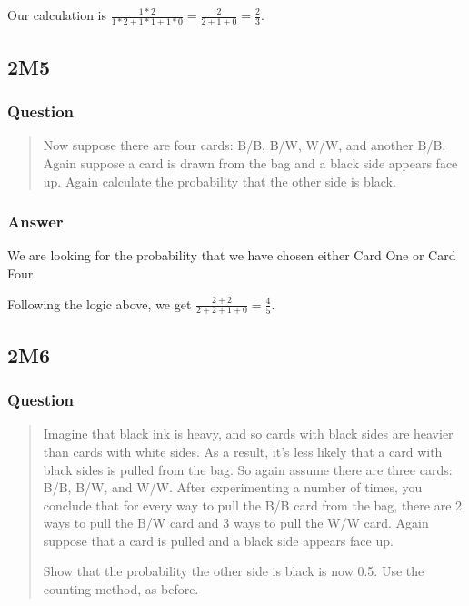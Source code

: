 \documentclass[
]{book}
\begin{document}
Our calculation is \(\frac{1 * 2}{1 * 2 + 1 * 1 + 1 * 0} = \frac{2}{2+1+0} = \frac{2}{3}\).

\hypertarget{m5}{%
\subsection*{2M5}\label{m5}}

\hypertarget{question-8}{%
\subsubsection*{Question}\label{question-8}}

\begin{quote}
Now suppose there are four cards: B/B, B/W, W/W, and another B/B. Again suppose a card is drawn from the bag and a black side appears face up. Again calculate the probability that the other side is black.
\end{quote}

\hypertarget{answer-8}{%
\subsubsection*{Answer}\label{answer-8}}

We are looking for the probability that we have chosen either Card One or Card Four.

Following the logic above, we get \(\frac{2 + 2}{2 + 2 + 1 + 0} = \frac{4}{5}\).

\hypertarget{m6}{%
\subsection*{2M6}\label{m6}}

\hypertarget{question-9}{%
\subsubsection*{Question}\label{question-9}}

\begin{quote}
Imagine that black ink is heavy, and so cards with black sides are heavier than cards with white sides. As a result, it's less likely that a card with black sides is pulled from the bag. So again assume there are three cards: B/B, B/W, and W/W. After experimenting a number of times, you conclude that for every way to pull the B/B card from the bag, there are 2 ways to pull the B/W card and 3 ways to pull the W/W card. Again suppose that a card is pulled and a black side appears face up.

Show that the probability the other side is black is now 0.5. Use the counting method, as before.
\end{quote}
\end{document}
